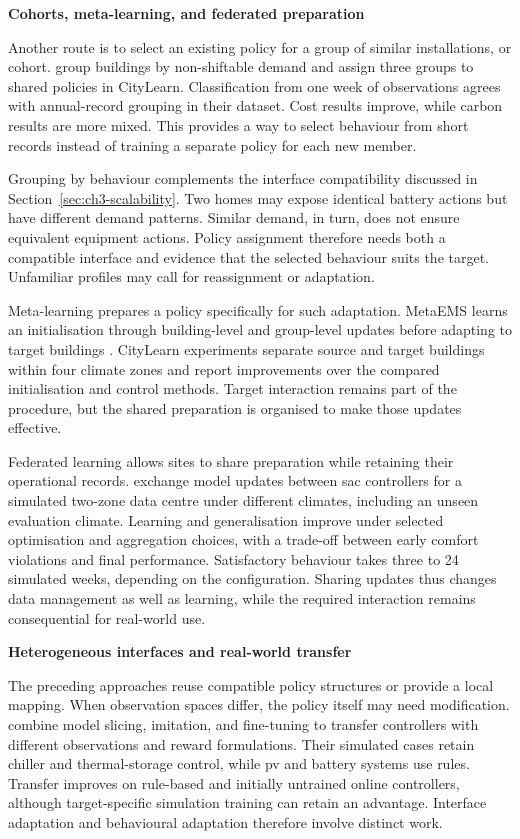 \smallskip
\noindent\textbf{Cohorts, meta-learning, and federated preparation}\par\nobreak\smallskip
Another route is to select an existing policy for a group of similar installations, or cohort. \textcite{zangato2025policymapping} group buildings by non-shiftable demand and assign three groups to shared policies in CityLearn. Classification from one week of observations agrees with annual-record grouping in their dataset. Cost results improve, while carbon results are more mixed. This provides a way to select behaviour from short records instead of training a separate policy for each new member.

Grouping by behaviour complements the interface compatibility discussed in Section~\ref{sec:ch3-scalability}. Two homes may expose identical battery actions but have different demand patterns. Similar demand, in turn, does not ensure equivalent equipment actions. Policy assignment therefore needs both a compatible interface and evidence that the selected behaviour suits the target. Unfamiliar profiles may call for reassignment or adaptation.

Meta-learning prepares a policy specifically for such adaptation. MetaEMS learns an initialisation through building-level and group-level updates before adapting to target buildings \parencite{zhang2025metaems}. CityLearn experiments separate source and target buildings within four climate zones and report improvements over the compared initialisation and control methods. Target interaction remains part of the procedure, but the shared preparation is organised to make those updates effective.

Federated learning allows sites to share preparation while retaining their operational records. \textcite{hagstrom2025federatedhvac} exchange model updates between \gls{sac} controllers for a simulated two-zone data centre under different climates, including an unseen evaluation climate. Learning and generalisation improve under selected optimisation and aggregation choices, with a trade-off between early comfort violations and final performance. Satisfactory behaviour takes three to 24 simulated weeks, depending on the configuration. Sharing updates thus changes data management as well as learning, while the required interaction remains consequential for real-world use.

\smallskip
\noindent\textbf{Heterogeneous interfaces and real-world transfer}\par\nobreak\smallskip
The preceding approaches reuse compatible policy structures or provide a local mapping. When observation spaces differ, the policy itself may need modification. \textcite{coraci2024heterogeneous} combine model slicing, imitation, and fine-tuning to transfer controllers with different observations and reward formulations. Their simulated cases retain chiller and thermal-storage control, while \gls{pv} and battery systems use rules. Transfer improves on rule-based and initially untrained online controllers, although target-specific simulation training can retain an advantage. Interface adaptation and behavioural adaptation therefore involve distinct work.

